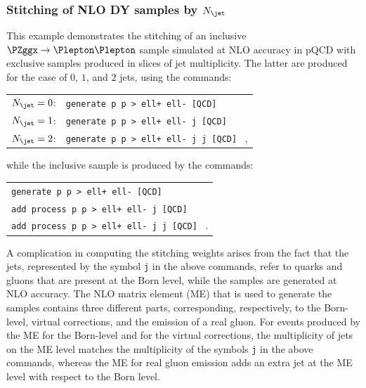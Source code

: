 \subsubsection{Stitching of NLO DY samples by \texorpdfstring{$N_{\jet}$}{Njet}}

This example demonstrates the stitching of an inclusive $\PZggx \to \Plepton\Plepton$ sample simulated at NLO accuracy in pQCD
with exclusive samples produced in slices of jet multiplicity.
The latter are produced for the case of $0$, $1$, and $2$ jets, using the \MGvATNLO commands:
\begin{center}
\begin{tabular}{ll}
$N_{\jet} = 0$: & \texttt{generate p p > ell+ ell- [QCD]} \\
$N_{\jet} = 1$: & \texttt{generate p p > ell+ ell- j [QCD]} \\
$N_{\jet} = 2$: & \texttt{generate p p > ell+ ell- j j [QCD]} \, ,
\end{tabular}
\end{center}
while the inclusive sample is produced by the commands:
\begin{center}
\begin{tabular}{l}
\texttt{generate p p > ell+ ell- [QCD]} \\
\texttt{add process p p > ell+ ell- j [QCD]} \\
\texttt{add process p p > ell+ ell- j j [QCD]} \, .
\end{tabular}
\end{center}

A complication in computing the stitching weights arises from the fact that the jets, represented by the symbol \texttt{j} in the above commands,
refer to quarks and gluons that are present at the Born level, while the samples are generated at NLO accuracy.
The NLO matrix element (ME) that is used to generate the samples contains three different parts, 
corresponding, respectively, to the Born-level, virtual corrections, and the emission of a real gluon.
For events produced by the ME for the Born-level and for the virtual corrections,
the multiplicity of jets on the ME level matches the multiplicity of the symbols \texttt{j} in the above \MGvATNLO commands,
whereas the ME for real gluon emission adds an extra jet at the ME level with respect to the Born level.

